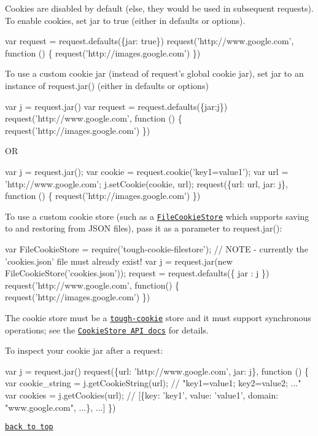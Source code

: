 Cookies are disabled by default (else, they would be used in subsequent requests). To enable cookies, set {\ttfamily jar} to {\ttfamily true} (either in {\ttfamily defaults} or {\ttfamily options}).


\begin{DoxyCode}
var request = request.defaults(\{jar: true\})
request('http://www.google.com', function () \{
  request('http://images.google.com')
\})
\end{DoxyCode}


To use a custom cookie jar (instead of {\ttfamily request}’s global cookie jar), set {\ttfamily jar} to an instance of {\ttfamily request.\+jar()} (either in {\ttfamily defaults} or {\ttfamily options})


\begin{DoxyCode}
var j = request.jar()
var request = request.defaults(\{jar:j\})
request('http://www.google.com', function () \{
  request('http://images.google.com')
\})
\end{DoxyCode}


OR


\begin{DoxyCode}
var j = request.jar();
var cookie = request.cookie('key1=value1');
var url = 'http://www.google.com';
j.setCookie(cookie, url);
request(\{url: url, jar: j\}, function () \{
  request('http://images.google.com')
\})
\end{DoxyCode}


To use a custom cookie store (such as a \href{https://github.com/mitsuru/tough-cookie-filestore}{\tt {\ttfamily File\+Cookie\+Store}} which supports saving to and restoring from J\+S\+ON files), pass it as a parameter to {\ttfamily request.\+jar()}\+:


\begin{DoxyCode}
var FileCookieStore = require('tough-cookie-filestore');
// NOTE - currently the 'cookies.json' file must already exist!
var j = request.jar(new FileCookieStore('cookies.json'));
request = request.defaults(\{ jar : j \})
request('http://www.google.com', function() \{
  request('http://images.google.com')
\})
\end{DoxyCode}


The cookie store must be a \href{https://github.com/SalesforceEng/tough-cookie}{\tt {\ttfamily tough-\/cookie}} store and it must support synchronous operations; see the \href{https://github.com/SalesforceEng/tough-cookie#cookiestore-api}{\tt {\ttfamily Cookie\+Store} A\+PI docs} for details.

To inspect your cookie jar after a request\+:


\begin{DoxyCode}
var j = request.jar()
request(\{url: 'http://www.google.com', jar: j\}, function () \{
  var cookie\_string = j.getCookieString(url); // "key1=value1; key2=value2; ..."
  var cookies = j.getCookies(url);
  // [\{key: 'key1', value: 'value1', domain: "www.google.com", ...\}, ...]
\})
\end{DoxyCode}


\href{#table-of-contents}{\tt back to top} 